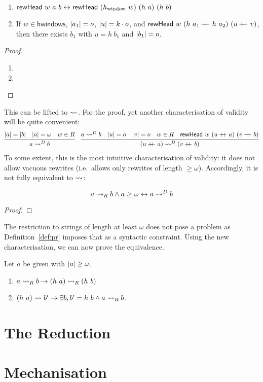 \begin{lemma}\label{lem:rewHead_agree}
  \begin{enumerate}
    \item $\rewHead{w}{a}{b} \leftrightarrow \rewHead{(h_{\text{window}}~w)}{(h~a)}{(h~b)}$
    \item If $w \in \textsf{hwindows}$, $\length{a_1} = o$, $\length{u} = k \cdot o$, and $\rewHead{w}{(h~a_1 \concat h~a_2)}{(u \concat v)}$, then there exists $b_1$ with $u = h~b_1$ and $\length{b_1} = o$.
  \end{enumerate}
\end{lemma}
\begin{proof}
  \begin{enumerate}
    \item 
    \item
  \end{enumerate}
\end{proof}

This can be lifted to $\strent{}$. For the proof, yet another characterisation of validity will be quite convenient:
\begin{align*}
  \infer{a \strentD{R} b}{\length{a} = \length{b} \quad \length{a} = \omega \quad w \in R}
  \quad 
  \infer{(u \concat a) \strentD{R} (v \concat b)}{a \strentD{R} b \quad \length{u} = o \quad \length{v} = o \quad w \in R \quad \rewHead{w}{(u \concat a)}{(v \concat b)}}
\end{align*}
To some extent, this is the most intuitive characterisation of validity: it does not allow vacuous rewrites (i.e.\ allows only rewrites of length $\ge \omega$). Accordingly, it is not fully equivalent to $\strent{}$:
\begin{lemma}
  \[a \strent{R} b \land a \ge \omega \leftrightarrow a \strentD{R} b \]
\end{lemma}
\begin{proof}
\end{proof}

The restriction to strings of length at least $\omega$ does not pose a problem as Definition~\ref{def:pr} imposes that as a syntactic constraint.
Using the new characterisation, we can now prove the equivalence.
\begin{lemma}
  Let $a$ be given with $\length{a} \ge \omega$.
  \begin{enumerate}
    \item $a \strent{R} b \rightarrow (h~a) \strent{R} (h~b)$
    \item $(h~a) \strent{} b' \rightarrow \exists b, b' = h~b \land a \strent{R} b$. 
  \end{enumerate}
\end{lemma}


\section{The Reduction}

\section{Mechanisation}
